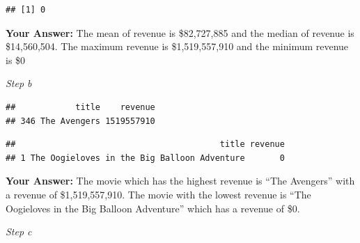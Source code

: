 \documentclass[
]{article}
\newenvironment{Shaded}{\begin{snugshade}}{\end{snugshade}}
\newcommand{\AttributeTok}[1]{\textcolor[rgb]{0.13,0.29,0.53}{#1}}
\newcommand{\CommentTok}[1]{\textcolor[rgb]{0.56,0.35,0.01}{\textit{#1}}}
\newcommand{\DocumentationTok}[1]{\textcolor[rgb]{0.56,0.35,0.01}{\textbf{\textit{#1}}}}
\newcommand{\FunctionTok}[1]{\textcolor[rgb]{0.13,0.29,0.53}{\textbf{#1}}}
\newcommand{\NormalTok}[1]{#1}
\newcommand{\SpecialCharTok}[1]{\textcolor[rgb]{0.81,0.36,0.00}{\textbf{#1}}}
\newcommand{\StringTok}[1]{\textcolor[rgb]{0.31,0.60,0.02}{#1}}
\begin{document}
\begin{verbatim}
## [1] 0
\end{verbatim}

\textbf{Your Answer:} The mean of revenue is \$82,727,885 and the median
of revenue is \$14,560,504. The maximum revenue is \$1,519,557,910 and
the minimum revenue is \$0

\emph{Step b}

\begin{Shaded}
\end{Shaded}

\begin{verbatim}
##            title    revenue
## 346 The Avengers 1519557910
\end{verbatim}

\begin{Shaded}
\end{Shaded}

\begin{verbatim}
##                                         title revenue
## 1 The Oogieloves in the Big Balloon Adventure       0
\end{verbatim}

\textbf{Your Answer:} The movie which has the highest revenue is ``The
Avengers'' with a revenue of \$1,519,557,910. The movie with the lowest
revenue is ``The Oogieloves in the Big Balloon Adventure'' which has a
revenue of \$0.

\emph{Step c}

\begin{Shaded}
\end{Shaded}
\end{document}
